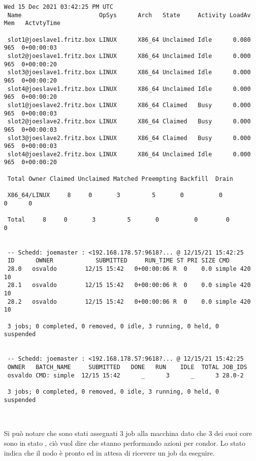 \begin{lstlisting}[style=output_tiny]
 Wed 15 Dec 2021 03:42:25 PM UTC
 Name                      OpSys      Arch   State     Activity LoadAv Mem   ActvtyTime
 
 slot1@joeslave1.fritz.box LINUX      X86_64 Unclaimed Idle      0.080  965  0+00:00:03
 slot2@joeslave1.fritz.box LINUX      X86_64 Unclaimed Idle      0.000  965  0+00:00:20
 slot3@joeslave1.fritz.box LINUX      X86_64 Unclaimed Idle      0.000  965  0+00:00:20
 slot4@joeslave1.fritz.box LINUX      X86_64 Unclaimed Idle      0.000  965  0+00:00:20
 slot1@joeslave2.fritz.box LINUX      X86_64 Claimed   Busy      0.000  965  0+00:00:03
 slot2@joeslave2.fritz.box LINUX      X86_64 Claimed   Busy      0.000  965  0+00:00:03
 slot3@joeslave2.fritz.box LINUX      X86_64 Claimed   Busy      0.000  965  0+00:00:03
 slot4@joeslave2.fritz.box LINUX      X86_64 Unclaimed Idle      0.000  965  0+00:00:20
 
 Total Owner Claimed Unclaimed Matched Preempting Backfill  Drain
 
 X86_64/LINUX     8     0       3         5       0          0        0      0
 
 Total     8     0       3         5       0          0        0      0
 
 
 -- Schedd: joemaster : <192.168.178.57:9618?... @ 12/15/21 15:42:25
 ID      OWNER            SUBMITTED     RUN_TIME ST PRI SIZE CMD
 28.0   osvaldo        12/15 15:42   0+00:00:06 R  0    0.0 simple 420 10
 28.1   osvaldo        12/15 15:42   0+00:00:06 R  0    0.0 simple 420 10
 28.2   osvaldo        12/15 15:42   0+00:00:06 R  0    0.0 simple 420 10
 
 3 jobs; 0 completed, 0 removed, 0 idle, 3 running, 0 held, 0 suspended
 
 
 -- Schedd: joemaster : <192.168.178.57:9618?... @ 12/15/21 15:42:25
 OWNER   BATCH_NAME     SUBMITTED   DONE   RUN    IDLE  TOTAL JOB_IDS
 osvaldo CMD: simple  12/15 15:42      _      3      _      3 28.0-2
 
 3 jobs; 0 completed, 0 removed, 0 idle, 3 running, 0 held, 0 suspended
 
\end{lstlisting}
\ \\
Si pu\`{o} notare che sono stati assegnati 3 job alla macchina  dato che 3 dei suoi core sono in stato , ci\`{o} vuol dire che stanno performando azioni per condor. %
Lo stato  indica che il nodo \`{e} pronto ed in attesa di ricevere un job da eseguire.


